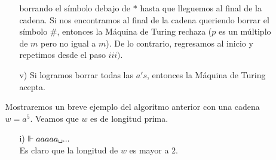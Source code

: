 \documentclass[letterpaper,10pt]{article}
\begin{document}
\begin{enumerate}
\begin{itemize}
\begin{itemize}
               borrando el símbolo debajo de $*$ hasta que lleguemos al
               final de la cadena. Si nos encontramos al final de la cadena
               queriendo borrar el símbolo $\#$, entonces la Máquina de 
               Turing rechaza ($p$ es un múltiplo de $m$ pero no igual a
               $m$). De lo contrario, regresamos al inicio y repetimos desde
               el paso $iii)$.
               \item[v)] Si logramos borrar todas las $a's$, entonces la 
               Máquina de Turing acepta. \\
           \end{itemize}
           Mostraremos un breve ejemplo del algoritmo anterior con una cadena
           $w = a^{5}$. Veamos que $w$ es de longitud prima. \\
           \begin{itemize}
               \item[i)] $\Vdash aaaaa\texttt{\char32}...$ \\
               Es claro que la longitud de $w$ es mayor a $2$. \\
               

\end{itemize}
\end{itemize}
\end{enumerate}
\end{document}
